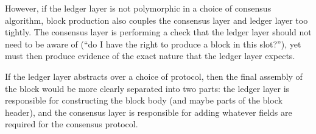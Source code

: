 \begin{itemize}
However, if the ledger layer is not
polymorphic in a choice of consensus algorithm, block production also couples
the consensus layer and ledger layer too tightly. The consensus layer is
performing a check that the ledger layer should not need to be aware of
(``do I have the right to produce a block in this slot?''), yet must then
produce evidence of the exact nature that the ledger layer expects.

If the ledger layer abstracts over a choice of protocol, then the final assembly
of the block would be more clearly separated into two parts: the ledger layer is
responsible for constructing the block body (and maybe parts of the block
header), and the consensus layer is responsible for adding whatever fields are
required for the consensus protocol.
\end{itemize}
